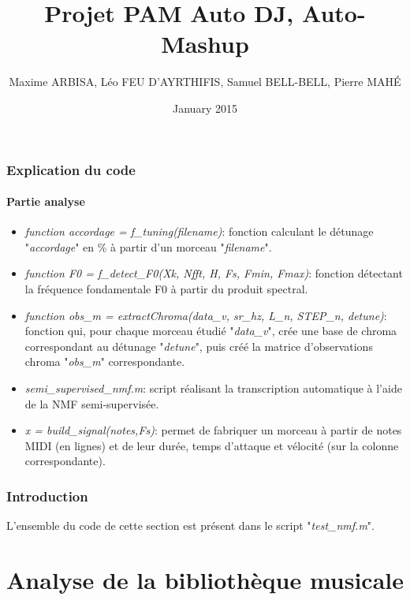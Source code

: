 \documentclass[12pt,a4paper]{article}
\begin{document}
\title{Projet PAM Auto DJ, Auto-Mashup}
\author{Maxime ARBISA, Léo FEU D'AYRTHIFIS, Samuel BELL-BELL, Pierre MAHÉ}
\date{January 2015}
\maketitle

\newpage
\tableofcontents
\newpage


\section*{Explication du code}
\subsection*{Partie analyse}
\begin{itemize}
\item \textit{function accordage = f\_tuning(filename)}: fonction calculant le détunage "\textit{accordage}" en \% à partir d'un morceau "\textit{filename}".

\item \textit{function F0 = f\_detect\_F0(Xk, Nfft, H, Fs, Fmin, Fmax)}: fonction détectant la fréquence fondamentale F0 à partir du produit spectral.

\item \textit{function obs\_m = extractChroma(data\_v, sr\_hz, L\_n, STEP\_n, detune)}: fonction qui, pour chaque morceau étudié "\textit{data\_v}", crée une base de chroma correspondant au détunage "\textit{detune}", puis créé la matrice d'observations chroma "\textit{obs\_m}" correspondante.
\\
\item \textit{semi\_supervised\_nmf.m}: script réalisant la transcription automatique à l'aide de la NMF semi-supervisée.
\\
\item \textit{x = build\_signal(notes,Fs)}: permet de fabriquer un morceau à partir de notes MIDI (en lignes) et de leur durée, temps d'attaque et vélocité (sur la colonne correspondante).
\end{itemize}

\section*{Introduction}
L'ensemble du code de cette section est présent dans le script "\textit{test\_nmf.m}".

\part{Analyse de la bibliothèque musicale}
\end{document}
